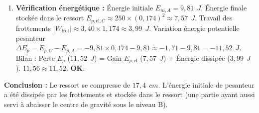 \documentclass[11pt]{article}
\begin{document}
\begin{exoresolu}
\begin{enumerate}
        \[ 250 x_{\max}^2 - 9,81 x_{\max} - 9,81 = -3,40 - 3,40 x_{\max} \]
        \[ 250 x_{\max}^2 - 6,41 x_{\max} - 6,41 = 0 \]
        \textbf{Résolution :} $\Delta = (-6,41)^2 - 4 \times 250 \times (-6,41) = 41,09 + 6410 = 6451,09$.
        $\sqrt{\Delta} \approx 80,32$.
        $x_{\max} = \frac{6,41 + 80,32}{2 \times 250} = \frac{86,73}{500} = 0,1735\ \SI{}{m}$ (racine positive).
        $\boxed{x_{\max} \approx 0,174\ \SI{}{m}\ (17,4\ \SI{}{cm})}$.
        \item \textbf{Vérification énergétique :}
        Énergie initiale $E_{m,A} = 9,81\ \SI{}{J}$.
        Énergie finale stockée dans le ressort $E_{p,\text{el},C} \approx 250 \times (0,174)^2 \approx 7,57\ \SI{}{J}$.
        Travail des frottements $|W_{\text{frot}}| \approx 3,40 \times 1,174 \approx 3,99\ \SI{}{J}$.
        Variation énergie potentielle pesanteur $\Delta E_p = E_{p,C} - E_{p,A} = -9,81 \times 0,174 - 9,81 \approx -1,71 - 9,81 = -11,52\ \SI{}{J}$.
        Bilan : Perte $E_p$ ($11,52\ \SI{}{J}$) = Gain $E_{p,\text{el}}$ ($7,57\ \SI{}{J}$) + Énergie dissipée ($3,99\ \SI{}{J}$). $11,56 \approx 11,52$. \textbf{OK}.
    \end{enumerate}
    \textbf{Conclusion :} Le ressort se compresse de $17,4\ \SI{}{cm}$. L'énergie initiale de pesanteur a été dissipée par les frottements et stockée dans le ressort (une partie ayant aussi servi à abaisser le centre de gravité sous le niveau B).
\end{exoresolu}
\end{document}
